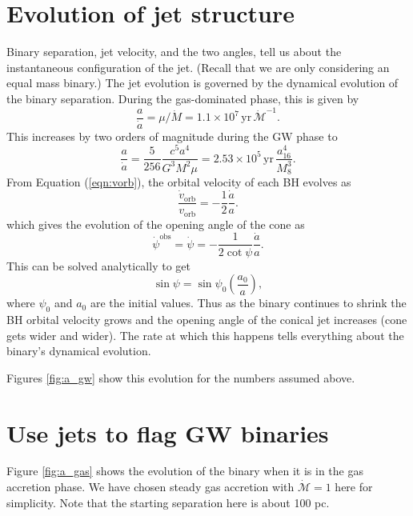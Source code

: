 \documentclass[iop]{emulateapj}
\begin{document}
\section{Evolution of jet structure}

Binary separation, jet velocity, and the two angles, tell us about the
instantaneous configuration of the jet.  (Recall that we are only
considering an equal mass binary.)  The jet evolution is governed by
the dynamical evolution of the binary separation.  During the
gas-dominated phase, this is given by
\begin{equation}
\frac{a}{\dot a} = \mu/\dot M = 1.1\times 10^7\, \mathrm{yr}\,\dot{\mathcal{M}}^{-1}.   
\end{equation}
This increases by two orders of magnitude during the GW phase to
\begin{equation}
\frac{a}{\dot a} = \frac{5}{256}\frac{c^5a^4}{G^3M^2\mu}=2.53\times 10^5\,\mathrm{yr}\,\frac{a_{16}^4}{M_8^3}.
\end{equation}
From Equation (\ref{eqn:vorb}), the orbital velocity of each BH evolves as
\begin{equation}
  \frac{\dot v_\mathrm{orb}}{v_\mathrm{orb}} = -\frac{1}{2}\frac{\dot a}{a}.
\end{equation}
which gives the evolution of the opening angle of the cone as 
\begin{equation}
  \dot\psi^\mathrm{obs}=\dot\psi = -\frac{1}{2\cot\psi}\frac{\dot a}{a}.
\end{equation}
This can be solved analytically to get
\begin{equation}
  \sin\psi = \sin\psi_0\left(\frac{a_0}{a}\right),
\end{equation}
where $\psi_0$ and $a_0$ are the initial values. Thus as the binary
continues to shrink the BH orbital velocity grows and the opening
angle of the conical jet increases (cone gets wider and wider).  The
rate at which this happens tells everything about the binary's
dynamical evolution.

Figures \ref{fig:a_gw} show this evolution for the numbers assumed
above.

\section{Use jets to flag GW binaries}

Figure \ref{fig:a_gas} shows the evolution of the binary when it is in
the gas accretion phase.  We have chosen steady gas accretion with
$\dot{\mathcal{M}}=1$ here for simplicity.  Note that the starting
separation here is about 100 pc. 
\end{document}

